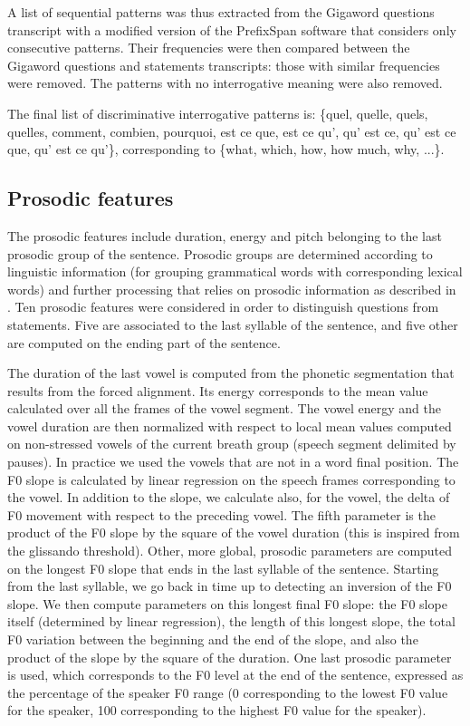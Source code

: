 \documentclass[runningheads,a4paper]{llncs}
\begin{document}
A list of sequential patterns was thus extracted from the Gigaword questions transcript with a modified version of the PrefixSpan software \cite{Pei:2001} that considers only consecutive patterns.
Their frequencies were then compared between the Gigaword questions and statements transcripts: those with similar frequencies were removed. The patterns with no interrogative meaning were also removed.

The final list of discriminative interrogative patterns is:
      \{quel, quelle, quels, quelles,
	comment, combien, pourquoi,
	est ce que, est ce qu', qu' est ce, qu' est ce que, qu' est ce qu'\}, corresponding to \{what, which, how, how much, why, ...\}.



\subsection{Prosodic features}

The prosodic features include duration, energy and pitch belonging to the last prosodic group of the sentence.
Prosodic groups are determined according to linguistic information (for grouping grammatical words with corresponding lexical words) and further processing that relies on prosodic information as described in \cite{Bartkova:2013}.
Ten prosodic features were considered in order to distinguish questions from statements. Five are associated to the last syllable of the sentence, and five other are computed on the ending part of the sentence.

The duration of the last vowel is computed from the phonetic segmentation that results from the forced alignment. Its energy corresponds to the mean value calculated over all the frames of the vowel segment. The vowel energy and the vowel duration are then normalized with respect to local mean values computed on non-stressed vowels of the current breath group (speech segment delimited by pauses). In practice we used the vowels that are not in a word final position.
The F0 slope is calculated by linear regression on the speech frames corresponding to the vowel. In addition to the slope, we calculate also, for the vowel, the delta of F0 movement with respect to the preceding vowel. The fifth parameter is the product of the F0 slope by the square of the vowel duration (this is inspired from the glissando threshold).
Other, more global, prosodic parameters are computed on the longest F0 slope that ends in the last syllable of the sentence.  Starting from the last syllable, we go back in time up to detecting an inversion of the F0 slope. We then compute parameters on this longest final F0 slope: the F0 slope itself (determined by linear regression), the length of this longest slope, the total F0 variation between the beginning and the end of the slope, and also the product of the slope by the square of the duration. One last prosodic parameter is used, which corresponds to the F0 level at the end of the sentence, expressed as the percentage of the speaker F0 range (0 corresponding to the lowest F0 value for the speaker, 100 corresponding to the highest F0 value for the speaker).
\end{document}
